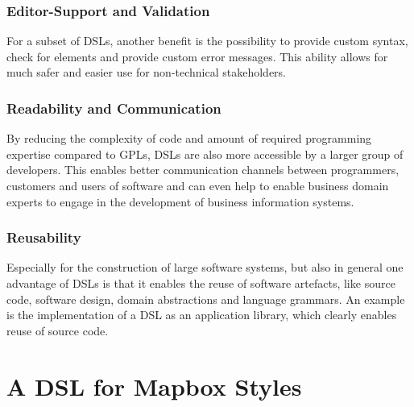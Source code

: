 \documentclass[conference]{IEEEtran}
\begin{document}
\subsubsection{Editor-Support and Validation}
For a subset of DSLs, another benefit is the possibility to provide custom syntax, check for elements and provide custom error messages. This ability allows for much safer and easier use for non-technical stakeholders.
\subsubsection{Readability and Communication}
By reducing the complexity of code and amount of required programming expertise compared to GPLs, DSLs are also more accessible by a larger group of developers. This enables better communication channels between programmers, customers and users of software and can even help to enable business domain experts to engage in the development of business information systems\cite{aram2015multilayered}.

\subsubsection{Reusability}
Especially for the construction of large software systems, but also in general one advantage of DSLs is that it enables the reuse of software artefacts, like source code, software design, domain abstractions and language grammars. An example is the implementation of a DSL as an application library, which clearly enables reuse of source code\cite{mernik2005and}.

\section{A DSL for Mapbox Styles}
\end{document}
